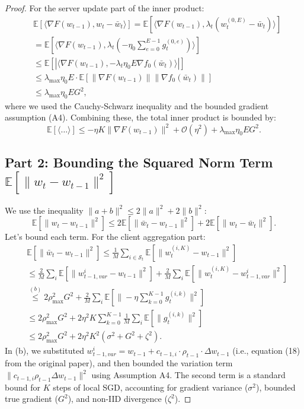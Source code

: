 \documentclass[11pt]{article}
\begin{document}
\begin{proof}
For the server update part of the inner product:
\begin{align}
    &\mathbb{E}[\langle \nabla F(w_{t-1}), w_t - \bar{w}_t \rangle] = \mathbb{E}[\langle \nabla F(w_{t-1}), \lambda_t(w_t^{(0,E)} - \bar{w}_t) \rangle] \nonumber \\
    &= \mathbb{E}[\langle \nabla F(w_{t-1}), \lambda_t(-\eta_0 \sum_{e=0}^{E-1} g_t^{(0,e)}) \rangle] \nonumber \\
    &\le \mathbb{E}[|\langle \nabla F(w_{t-1}), -\lambda_t \eta_0 E \nabla f_0(\bar{w}_t) \rangle|] \nonumber \\
    &\le \lambda_{\max}\eta_0 E \cdot \mathbb{E}[\|\nabla F(w_{t-1})\| \|\nabla f_0(\bar{w}_t)\|] \nonumber \\
    &\le \lambda_{\max}\eta_0 E G^2,
\end{align}
where we used the Cauchy-Schwarz inequality and the bounded gradient assumption (A4).
Combining these, the total inner product is bounded by:
\begin{equation}
    \mathbb{E}[\langle \dots \rangle] \le -\eta K \|\nabla F(w_{t-1})\|^2 + \mathcal{O}(\eta^2) + \lambda_{\max}\eta_0 E G^2. \label{eq:bound_inner_prod_supp}
\end{equation}

\subsection{Part 2: Bounding the Squared Norm Term $\mathbb{E}[\|w_t - w_{t-1}\|^2]$}

We use the inequality $\|a+b\|^2 \le 2\|a\|^2 + 2\|b\|^2$:
\begin{equation}
    \mathbb{E}[\|w_t - w_{t-1}\|^2] \le 2\mathbb{E}[\|\bar{w}_t - w_{t-1}\|^2] + 2\mathbb{E}[\|w_t - \bar{w}_t\|^2].
\end{equation}
Let's bound each term. For the client aggregation part:
\begin{align}
    &\mathbb{E}[\|\bar{w}_t - w_{t-1}\|^2] \le \frac{1}{M}\sum_{i \in \mathcal{S}_t} \mathbb{E}[\|w_t^{(i,K)} - w_{t-1}\|^2] \nonumber \\
    &\le \frac{2}{M}\sum_{i} \mathbb{E}[\|w_{t-1,var}^i - w_{t-1}\|^2] + \frac{2}{M}\sum_{i} \mathbb{E}[\|w_t^{(i,K)} - w_{t-1,var}^i\|^2] \nonumber \\
    &\overset{(b)}{\le} 2\rho_{\max}^2 G^2 + \frac{2}{M}\sum_{i} \mathbb{E}[\|-\eta \sum_{k=0}^{K-1} g_t^{(i,k)}\|^2] \nonumber \\
    &\le 2\rho_{\max}^2 G^2 + 2\eta^2 K \sum_{k=0}^{K-1} \frac{1}{M}\sum_i \mathbb{E}[\|g_t^{(i,k)}\|^2] \nonumber \\
    &\le 2\rho_{\max}^2 G^2 + 2\eta^2 K^2 (\sigma^2 + G^2 + \zeta^2).
\end{align}
In (b), we substituted $w_{t-1, var}^{i} = w_{t-1} + c_{t-1,i} \cdot \rho_{t-1} \cdot \Delta w_{t-1}$ (i.e., equation (18) from the original paper), and then bounded the variation term $\|c_{t-1,i} \rho_{t-1} \Delta w_{t-1}\|^2$ using Assumption A4. The second term is a standard bound for $K$ steps of local SGD, accounting for gradient variance ($\sigma^2$), bounded true gradient ($G^2$), and non-IID divergence ($\zeta^2$).


\end{proof}
\end{document}
